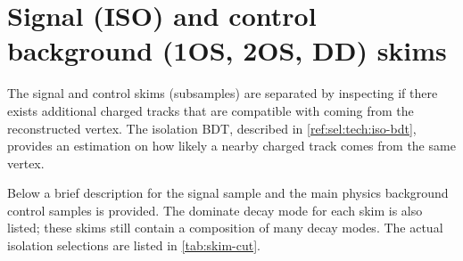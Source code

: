 \section{Signal (ISO) and control background (1OS, 2OS, DD) skims}
\label{ref:sel:skims}

The signal and control skims (subsamples) are separated by inspecting if there
exists additional charged tracks that are compatible with coming from the
reconstructed \B vertex.
The isolation BDT, described in \cref{ref:sel:tech:iso-bdt}, provides an
estimation on how likely a nearby charged track comes from the same \B vertex.

Below a brief description for the signal sample and the main physics background
control samples is provided.
The dominate decay mode for each skim is also listed; these skims still contain
a composition of many decay modes.
The actual isolation selections are listed in \cref{tab:skim-cut}.

